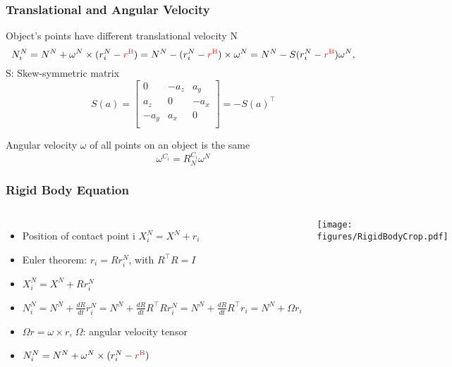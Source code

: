 \documentclass{beamer}
\begin{document}

\begin{frame}
\frametitle{Translational and Angular Velocity }
Object's points have different translational velocity N 
\begin{equation*}
N_{i}^{N}=N^N + \omega^N\times (r_{i}^{N}-{\color{red}r^{\textrm{B}}}) = N^N - (r_i^N-{\color{red}r^{\textrm{B}}})\times \omega^N= N^N - S(r_i^N-{\color{red}r^{\textrm{B}}}) \omega^N,
\end{equation*}
S: Skew-symmetric matrix 
\begin{equation*}
S(a)=\begin{bmatrix}
0 & -a_z & a_y \\
a_z & 0 & -a_x \\
-a_y& a_x & 0 \\
\end{bmatrix}=-S(a)^{\intercal}
\end{equation*}

Angular velocity $\omega$ of all points on an object is the same
\begin{equation*}
\omega^{C_i} = R_{N}^{C_i}\omega^{N}
\end{equation*}

\end{frame}


\begin{frame}
\frametitle{Rigid Body Equation}
\begin{columns}[c] 

\begin{itemize}
\item Position of contact point i $X^{N}_{i}=X^N + r_{i}$ \vspace{.2cm}
\item Euler theorem: $r_{i} = Rr_{i}^{N}$, with $R^{\intercal}R=I$ \vspace{.2cm}
\item $X^{N}_{i}=X^N + Rr_{i}^{N}$ \vspace{.2cm}
\item $N^{N}_{i}=N^N + \frac{dR}{dt} r_{i}^{N}=N^N + \frac{dR}{dt} R^{\intercal}Rr_{i}^{N}=N^N + \frac{dR}{dt} R^{\intercal}r_{i}= N^N + \Omega r_{i}$ \vspace{.2cm}
\item $\Omega r=\omega\times r $, $\Omega$: angular velocity tensor \vspace{.2cm}
\item $N_{i}^{N}=N^N + \omega^N\times (r_{i}^{N}-{\color{red}r^{\textrm{B}}})$
\end{itemize}

\centering
 \texttt{[image: figures/RigidBodyCrop.pdf]}
\end{columns}
\end{frame}
\end{document}
